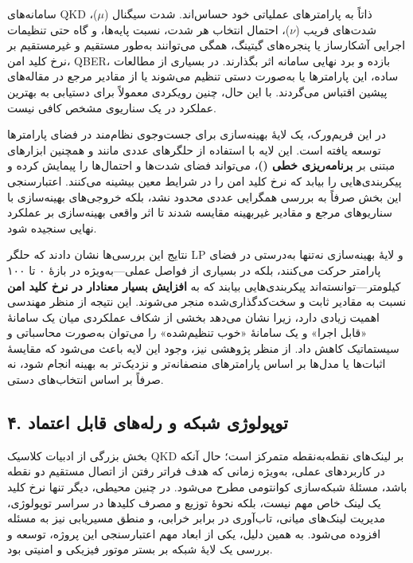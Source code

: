 \begin{sloppypar}
سامانه‌های QKD ذاتاً به پارامترهای عملیاتی خود حساس‌اند. شدت سیگنال (\(\mu\))، شدت‌های فریب (\(\nu\))، احتمال انتخاب هر شدت، نسبت پایه‌ها، و گاه حتی تنظیمات اجرایی آشکارساز یا پنجره‌های گیتینگ، همگی می‌توانند به‌طور مستقیم و غیرمستقیم بر نرخ کلید امن، QBER، بازده و برد نهایی سامانه اثر بگذارند. در بسیاری از مطالعات ساده، این پارامترها یا به‌صورت دستی تنظیم می‌شوند یا از مقادیر مرجع در مقاله‌های پیشین اقتباس می‌گردند. با این حال، چنین رویکردی معمولاً برای دستیابی به بهترین عملکرد در یک سناریوی مشخص کافی نیست.

در این فریم‌ورک، یک لایهٔ بهینه‌سازی برای جست‌وجوی نظام‌مند در فضای پارامترها توسعه یافته است. این لایه با استفاده از حلگرهای عددی مانند  و همچنین ابزارهای مبتنی بر \textbf{برنامه‌ریزی خطی ()}، می‌تواند فضای شدت‌ها و احتمال‌ها را پیمایش کرده و پیکربندی‌هایی را بیابد که نرخ کلید امن را در شرایط معین بیشینه می‌کنند. اعتبارسنجی این بخش صرفاً به بررسی همگرایی عددی محدود نشد، بلکه خروجی‌های بهینه‌سازی با سناریوهای مرجع و مقادیر غیر‌بهینه مقایسه شدند تا اثر واقعی بهینه‌سازی بر عملکرد نهایی سنجیده شود.

نتایج این بررسی‌ها نشان دادند که حلگر LP و لایهٔ بهینه‌سازی نه‌تنها به‌درستی در فضای پارامتر حرکت می‌کنند، بلکه در بسیاری از فواصل عملی—به‌ویژه در بازهٔ ۰ تا ۱۰۰ کیلومتر—توانسته‌اند پیکربندی‌هایی بیابند که به \textbf{افزایش بسیار معنادار در نرخ کلید امن} نسبت به مقادیر ثابت و سخت‌کدگذاری‌شده منجر می‌شوند. این نتیجه از منظر مهندسی اهمیت زیادی دارد، زیرا نشان می‌دهد بخشی از شکاف عملکردی میان یک سامانهٔ «قابل اجرا» و یک سامانهٔ «خوب تنظیم‌شده» را می‌توان به‌صورت محاسباتی و سیستماتیک کاهش داد. از منظر پژوهشی نیز، وجود این لایه باعث می‌شود که مقایسهٔ اثبات‌ها یا مدل‌ها بر اساس پارامترهای منصفانه‌تر و نزدیک‌تر به بهینه انجام شود، نه صرفاً بر اساس انتخاب‌های دستی.

\subsection*{۴. توپولوژی شبکه و رله‌های قابل اعتماد}

بخش بزرگی از ادبیات کلاسیک QKD بر لینک‌های نقطه‌به‌نقطه متمرکز است؛ حال آنکه در کاربردهای عملی، به‌ویژه زمانی که هدف فراتر رفتن از اتصال مستقیم دو نقطه باشد، مسئلهٔ شبکه‌سازی کوانتومی مطرح می‌شود. در چنین محیطی، دیگر تنها نرخ کلید یک لینک خاص مهم نیست، بلکه نحوهٔ توزیع و مصرف کلیدها در سراسر توپولوژی، مدیریت لینک‌های میانی، تاب‌آوری در برابر خرابی، و منطق مسیریابی نیز به مسئله افزوده می‌شود. به همین دلیل، یکی از ابعاد مهم اعتبارسنجی این پروژه، توسعه و بررسی یک لایهٔ شبکه بر بستر موتور فیزیکی و امنیتی بود.


\end{sloppypar}

